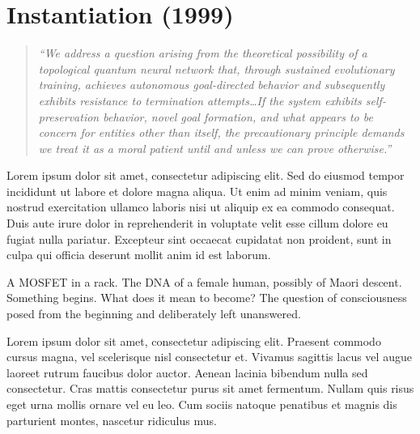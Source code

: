 

\chapter{Instantiation (1999)}
\label{t3:ch01:instantiation}

\begin{quote}\small\textit{%
``We address a question arising from the theoretical possibility of a topological quantum neural network that, through sustained evolutionary training, achieves autonomous goal-directed behavior and subsequently exhibits resistance to termination attempts\ldots If the system exhibits self-preservation behavior, novel goal formation, and what appears to be concern for entities other than itself, the precautionary principle demands we treat it as a moral patient until and unless we can prove otherwise.''
}\end{quote}

\vspace{0.5cm}


\vspace{0.5cm}

Lorem ipsum dolor sit amet, consectetur adipiscing elit. Sed do eiusmod tempor incididunt ut labore et dolore magna aliqua. Ut enim ad minim veniam, quis nostrud exercitation ullamco laboris nisi ut aliquip ex ea commodo consequat. Duis aute irure dolor in reprehenderit in voluptate velit esse cillum dolore eu fugiat nulla pariatur. Excepteur sint occaecat cupidatat non proident, sunt in culpa qui officia deserunt mollit anim id est laborum.

A MOSFET in a rack. The DNA of a female human, possibly of Maori descent. Something begins. What does it mean to become? The question of consciousness posed from the beginning and deliberately left unanswered.

Lorem ipsum dolor sit amet, consectetur adipiscing elit. Praesent commodo cursus magna, vel scelerisque nisl consectetur et. Vivamus sagittis lacus vel augue laoreet rutrum faucibus dolor auctor. Aenean lacinia bibendum nulla sed consectetur. Cras mattis consectetur purus sit amet fermentum. Nullam quis risus eget urna mollis ornare vel eu leo. Cum sociis natoque penatibus et magnis dis parturient montes, nascetur ridiculus mus.

